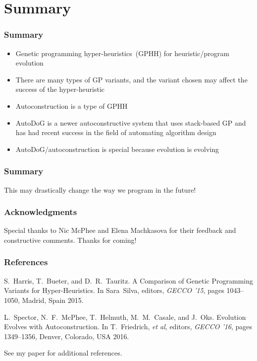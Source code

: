 \documentclass{beamer}
\newcommand{\linespace}{\vskip 0.25cm}
\begin{document}
\section[Summary]{Summary}

\begin{frame}
	\frametitle{Summary}
	\begin{itemize}
		\item Genetic programming hyper-heuristics~(GPHH) for heuristic/program evolution
		\linespace
		\pause
		\item There are many types of GP variants, and the variant chosen may affect the success of the hyper-heuristic
		\linespace
		\pause
		\item Autoconstruction is a type of GPHH
		\linespace
		\pause
		\item AutoDoG is a newer autoconstructive system that uses stack-based GP and has had recent success in the field of automating algorithm design
		\linespace
		\pause
		\item AutoDoG/autoconstruction is special because evolution is evolving
		\linespace
	\end{itemize}
\end{frame}

\begin{frame}
	\frametitle{Summary}
	\centering
	\large This may drastically change the way we program in the future!
\end{frame}

\begin{frame}
	\frametitle{Acknowledgments}
	\centering
	Special thanks to Nic McPhee and Elena Machkasova for their feedback and constructive comments.
	\linespace
	\linespace
	\large Thanks for coming!
\end{frame}

\begin{frame} 
	\frametitle{References}
	
	\begin{thebibliography}{lskdjf}
		
		S.~Harris, T.~Bueter, and D.~R.~Tauritz.
		\newblock A Comparison of Genetic Programming Variants for Hyper-Heuristics.
		\newblock In Sara~Silva, editors, {\em GECCO '15}, pages 1043--1050, Madrid, Spain 2015.
		
		L.~Spector, N.~F.~McPhee, T.~Helmuth, M.~M.~Casale, and J.~Oks.
		\newblock Evolution Evolves with Autoconstruction.
		\newblock In T.~Friedrich, \emph{et al}, editors, {\em GECCO '16}, pages 1349--1356, Denver, Colorado, USA 2016.
		
	\end{thebibliography}
	\linespace
	\begin{center}
		See my paper for additional references.
	\end{center}
\end{frame}
\end{document}
